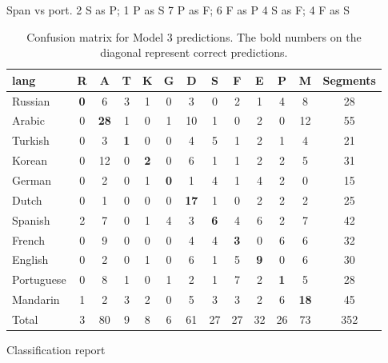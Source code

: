 \documentclass[11pt, letterpaper]{article}
\begin{document}
Span vs port.
2 S as P; 1 P as S
7 P as F; 6 F as P
4 S as F; 4 F as S


\begin{table}
\begin{center}
\caption{Confusion matrix for Model 3 predictions. The bold numbers on the diagonal represent correct predictions.}
\begin{tabular}{l | c c c c c c c c c c c || c}

lang   & R &A &T &K &G &D &S &F &E &P &M & Segments\\ \hline
Russian   & \textbf{0} &6 &3 &1 &0 &3 &0 &2 &1 &4 & 8 & 28\\ %
Arabic   & 0 &\textbf{28} &1 &0 &1 &10 &1 &0 &2 &0 &12 & 55\\ %
Turkish   & 0 &3 &\textbf{1} &0 &0 &4 &5 &1 &2 &1 &4 & 21\\ %
Korean   & 0 &12 &0 &\textbf{2} &0 &6 &1 &1 &2 &2 &5 & 31 \\ %
German   & 0 &2 &0 &1 &\textbf{0} &1 &4 &1 &4 &2 &0 &15 \\ %
Dutch   & 0 &1 &0 &0 &0 &\textbf{17} & 1 & 0 & 2 & 2 & 2 & 25 \\ %
Spanish   & 2 &7 &0 &1 &4 &3 &\textbf{6} &4 &6 &2 &7& 42\\ %
French   & 0 &9 &0 &0 &0 &4 &4 &\textbf{3} &0 &6 &6 & 32\\ %
English   & 0 &2 &0 &1 &0 &6 &1 &5 &\textbf{9} &0 &6 & 30\\ %
Portuguese   & 0 &8 &1 &0 &1 &2 &1 &7 &2 &\textbf{1} &5 & 28\\ %
Mandarin & 1 &2 &3 &2 &0 &5 &3 &3 &2 &6 &\textbf{18} & 45 \\ \hline %
\hline
Total & 3 & 80 & 9 & 8  & 6 & 61 & 27 & 27 & 32 & 26  & 73 &  352

\end{tabular}
\label{tab:LangConfMat}
\end{center}
\end{table}

Classification report
\end{document}
